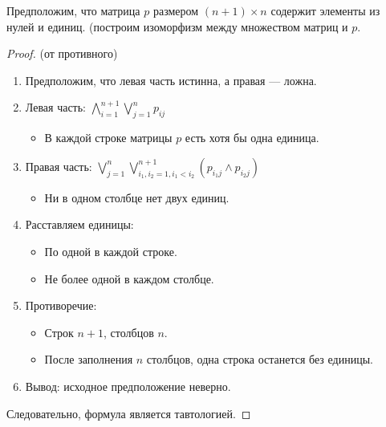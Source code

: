 \documentclass[12pt,a4paper]{article}
\begin{document}
Предположим, что матрица \(p\) размером \((n+1) \times n\) содержит элементы из нулей и единиц. (построим изоморфизм между множеством матриц и $p$.

\begin{proof} (от противного)

\begin{enumerate}[label=\arabic*., leftmargin=*]
\item Предположим, что левая часть истинна, а правая — ложна.

\item Левая часть: $\bigwedge_{i=1}^{n+1} \bigvee_{j=1}^n p_{ij}$
   \begin{itemize}
   \item В каждой строке матрицы $p$ есть хотя бы одна единица.
   \end{itemize}

\item Правая часть: $\bigvee_{j=1}^n \bigvee_{i_1, i_2=1, i_1<i_2}^{n+1} (p_{i_1j} \wedge p_{i_2j})$
   \begin{itemize}
   \item Ни в одном столбце нет двух единиц.
   \end{itemize}

\item Расставляем единицы:
   \begin{itemize}
   \item По одной в каждой строке.
   \item Не более одной в каждом столбце.
   \end{itemize}

\item Противоречие:
   \begin{itemize}
   \item Строк $n+1$, столбцов $n$.
   \item После заполнения $n$ столбцов, одна строка останется без единицы.
   \end{itemize}

\item Вывод: исходное предположение неверно.
\end{enumerate}

Следовательно, формула является тавтологией.
\end{proof}
\end{document}
